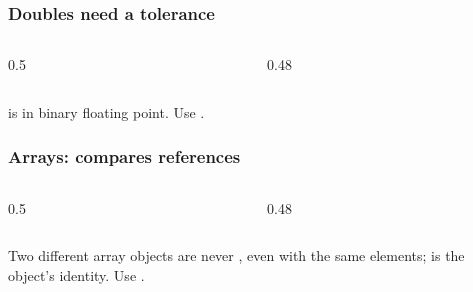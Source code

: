\documentclass[aspectratio=169,10pt,compress]{beamer}
\begin{document}
\begin{frame}[t,fragile] \frametitle{Doubles need a tolerance}
  \begin{columns}[T]
    \begin{column}{0.5\textwidth}
    \end{column}
    \begin{column}{0.48\textwidth}
    \end{column}
  \end{columns}

  \vspace{0.2em}
  \small {} is  in binary floating point. Use .
\end{frame}




\begin{frame}[t,fragile] \frametitle{Arrays:  compares references}
  \begin{columns}[T]
    \begin{column}{0.5\textwidth}
    \end{column}
    \begin{column}{0.48\textwidth}
    \end{column}
  \end{columns}

  \vspace{0.2em}
  \small Two different array objects are never , even with the same elements; \hCode{[I@\dots} is
  the object's identity. Use .
\end{frame}
\end{document}
